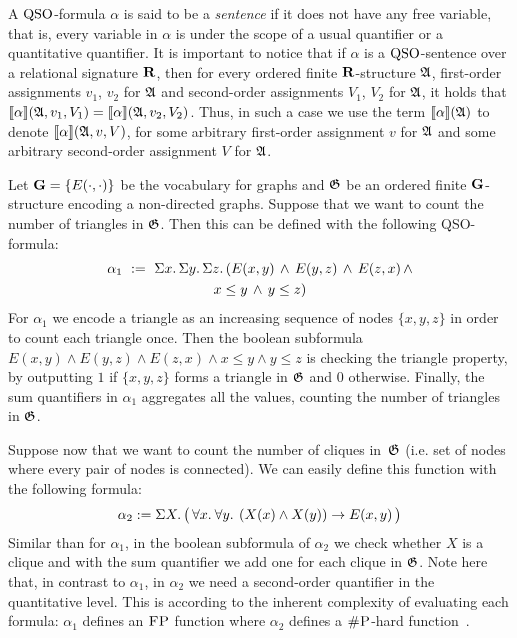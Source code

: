 A ${\rm QSO}$-formula $\alpha$ is said to be a \emph{sentence} if it does not have any free variable, that is, every variable in $\alpha$ is under the scope of a usual quantifier or a quantitative quantifier. It is important to notice that if $\alpha$ is a ${\rm QSO}$-sentence over a relational signature $\mathbf{R}$, then for every ordered finite $\mathbf{R}$-structure $\mathfrak{A}$, first-order assignments $v_1$, $v_2$ for $\mathfrak{A}$ and second-order assignments $V_1$, $V_2$ for $\mathfrak{A}$, it holds that ${\llbracket{}{\alpha}\rrbracket}(\mathfrak{A}, v_1, V_1) = {\llbracket{}{\alpha}\rrbracket}(\mathfrak{A}, v_2, V_2)$.
Thus, in such a case we use the term ${\llbracket{}{\alpha}\rrbracket}(\mathfrak{A})$ to denote ${\llbracket{}{\alpha}\rrbracket}(\mathfrak{A}, v, V)$, for some arbitrary first-order assignment $v$ for $\mathfrak{A}$ and some arbitrary second-order assignment $V$ for $\mathfrak{A}$. 
\begin{example}
Let $\mathbf{G} = \{E(\cdot,\cdot)\}$ be the vocabulary for graphs and $\mathfrak{G}$ be an ordered finite $\mathbf{G}$-structure encoding a non-directed graphs. 
Suppose that we want to count the number of triangles in $\mathfrak{G}$. Then this can be defined with the following QSO-formula:
\begin{multline*}
\alpha_1 \ := \ \Sigma{x}.\, \Sigma{y}.\, \Sigma{z}.\, ( E(x,y) \, \wedge \, E(y,z) \, \wedge \, E(z,x) \, \wedge \\
x \leq y \, \wedge \, y \leq z )
\end{multline*}
For $\alpha_1$ we encode a triangle as an increasing sequence of nodes $\{x, y, z\}$ in order to count each triangle once. Then the boolean subformula  $E(x,y) \wedge E(y,z) \wedge E(z,x) \wedge
x \leq y \wedge y \leq z$ is checking the triangle property, by outputting $1$ if $\{x, y, z\}$ forms a triangle in $\mathfrak{G}$ and $0$ otherwise.
Finally, the sum quantifiers in $\alpha_1$ aggregates all the values, counting the number of triangles in $\mathfrak{G}$.

Suppose now that we want to count the number of cliques in~$\mathfrak{G}$ (i.e. set of nodes where every pair of nodes is connected). We can easily define this function with the following formula:
$$
\alpha_2 := \Sigma{X}.\, \big( \, \forall{x}.\: \forall{y}.\: \left(X(x) \wedge X(y)\right) \rightarrow E(x,y) \, \big)  
$$ 
Similar than for $\alpha_1$, in the boolean subformula of $\alpha_2$ we check whether $X$ is a clique and with the sum quantifier we add one for each clique in $\mathfrak{G}$. 
Note here that, in contrast to $\alpha_1$, in $\alpha_2$ we need a second-order quantifier in the quantitative level.
This is according to the inherent complexity of evaluating each formula: $\alpha_1$ defines an $\text{\sc FP}$ function where $\alpha_2$ defines a $\text{\sc \#P}$-hard function~\cite{paper-that-shows-that-this-problem-is-sharpP-hard}.
\end{example}
